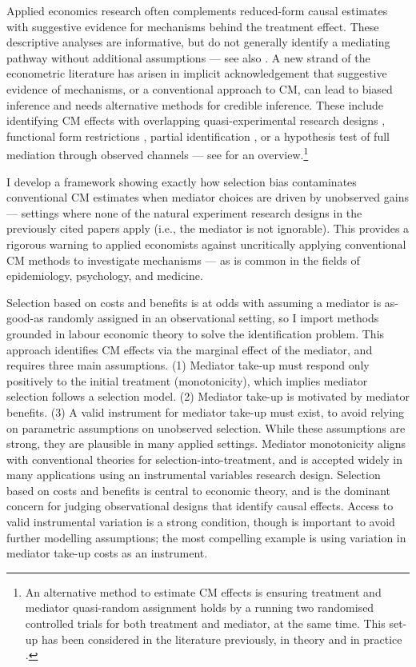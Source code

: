 Applied economics research often complements reduced-form causal estimates with suggestive evidence for mechanisms behind the treatment effect.
These descriptive analyses are informative, but do not generally identify a mediating pathway without additional assumptions --- see also \citet{blackwell2024assumption,green2010enough}.
A new strand of the econometric literature has arisen in implicit acknowledgement that suggestive evidence of mechanisms, or a conventional approach to CM, can lead to biased inference and needs alternative methods for credible inference.
These include identifying CM effects with overlapping quasi-experimental research designs \citep{deuchert2019direct,frolich2017direct}, functional form restrictions \citep{heckman2015econometric,heckman2013understanding}, partial identification \citep{flores2009identification}, or a hypothesis test of full mediation through observed channels \citep{kwon2024testing} --- see \cite{huber2019review} for an overview.\footnote{
    An alternative method to estimate CM effects is ensuring treatment and mediator quasi-random assignment holds by a running two randomised controlled trials for both treatment and mediator, at the same time.
    This set-up has been considered in the literature previously, in theory \citep{imai2013experimental} and in practice \citep{ludwig2011mechanism}.
}

I develop a framework showing exactly how selection bias contaminates conventional CM estimates when mediator choices are driven by unobserved gains --- settings where none of the natural experiment research designs in the previously cited papers apply (i.e., the mediator is not ignorable).
This provides a rigorous warning to applied economists against uncritically applying conventional CM methods to investigate mechanisms --- as is common in the fields of epidemiology, psychology, and medicine.

Selection based on costs and benefits is at odds with assuming a mediator is as-good-as randomly assigned in an observational setting, so I import methods grounded in labour economic theory to solve the identification problem.
This approach identifies CM effects via the marginal effect of the mediator, and requires three main assumptions.
(1) Mediator take-up must respond only positively to the initial treatment (monotonicity), which implies mediator selection follows a selection model.
(2) Mediator take-up is motivated by mediator benefits.
(3) A valid instrument for mediator take-up must exist, to avoid relying on parametric assumptions on unobserved selection.
While these assumptions are strong, they are plausible in many applied settings.
Mediator monotonicity aligns with conventional theories for selection-into-treatment, and is accepted widely in many applications using an instrumental variables research design.
Selection based on costs and benefits is central to economic theory, and is the dominant concern for judging observational designs that identify causal effects.
Access to valid instrumental variation is a strong condition, though is important to avoid further modelling assumptions; the most compelling example is using variation in mediator take-up costs as an instrument.

